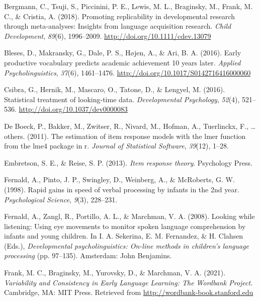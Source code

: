 \documentclass[10pt, letterpaper]{article}
\begin{document}
\leavevmode\hypertarget{ref-Bergmann2018}{}%
Bergmann, C., Tsuji, S., Piccinini, P. E., Lewis, M. L., Braginsky, M.,
Frank, M. C., \& Cristia, A. (2018). Promoting replicability in
developmental research through meta-analyses: Insights from language
acquisition research. \emph{Child Development}, \emph{89}(6),
1996--2009. \url{http://doi.org/10.1111/cdev.13079}

\leavevmode\hypertarget{ref-Bleses2016}{}%
Bleses, D., Makransky, G., Dale, P. S., Højen, A., \& Ari, B. A. (2016).
Early productive vocabulary predicts academic achievement 10 years
later. \emph{Applied Psycholinguistics}, \emph{37}(6), 1461--1476.
\url{http://doi.org/10.1017/S0142716416000060}

\leavevmode\hypertarget{ref-Csibra2016}{}%
Csibra, G., Hernik, M., Mascaro, O., Tatone, D., \& Lengyel, M. (2016).
Statistical treatment of looking-time data. \emph{Developmental
Psychology}, \emph{52}(4), 521--536.
\url{http://doi.org/10.1037/dev0000083}

\leavevmode\hypertarget{ref-de-boeck2011}{}%
De Boeck, P., Bakker, M., Zwitser, R., Nivard, M., Hofman, A.,
Tuerlinckx, F., \ldots{} others. (2011). The estimation of item response
models with the lmer function from the lme4 package in r. \emph{Journal
of Statistical Software}, \emph{39}(12), 1--28.

\leavevmode\hypertarget{ref-embretson2013}{}%
Embretson, S. E., \& Reise, S. P. (2013). \emph{Item response theory}.
Psychology Press.

\leavevmode\hypertarget{ref-fernald1998}{}%
Fernald, A., Pinto, J. P., Swingley, D., Weinberg, A., \& McRoberts, G.
W. (1998). Rapid gains in speed of verbal processing by infants in the
2nd year. \emph{Psychological Science}, \emph{9}(3), 228--231.

\leavevmode\hypertarget{ref-Fernald2008}{}%
Fernald, A., Zangl, R., Portillo, A. L., \& Marchman, V. A. (2008).
Looking while listening: Using eye movements to monitor spoken language
comprehension by infants and young children. In I. A. Sekerina, E. M.
Fernandez, \& H. Clahsen (Eds.), \emph{Developmental psycholinguistics:
On-line methods in children's language processing} (pp. 97--135).
Amsterdam: John Benjamins.

\leavevmode\hypertarget{ref-frank2021}{}%
Frank, M. C., Braginsky, M., Yurovsky, D., \& Marchman, V. A. (2021).
\emph{Variability and Consistency in Early Language Learning: The
Wordbank Project}. Cambridge, MA: MIT Press. Retrieved from
\url{http://wordbank-book.stanford.edu}
\end{document}
